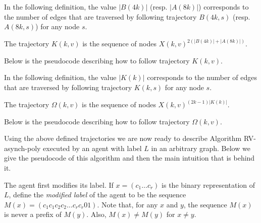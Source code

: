 \documentclass [11pt] {article}
\begin{document}
{In the following definition, the value $|B(4k)|$ (resp. $|A(8k)|$) corresponds to the number of edges that are traversed by following trajectory $B(4k,s)$ (resp. $A(8k,s)$) for any node $s$.}

\begin{definition}
\label{def:K}
The trajectory $K(k,v)$ is the sequence of nodes $X(k,v)^{2(|B(4k)|+|A(8k)|)}$. 
\end{definition}

{Below is the pseudocode describing how to follow trajectory $K(k,v)$.}

\begin{center}
\end{center} 

{In the following definition, the value $|K(k)|$ corresponds to the number of edges that are traversed by following trajectory $K(k,s)$ for any node $s$.}

\begin{definition}
\label{def:ome}
The trajectory $\Omega(k,v)$ is the sequence of nodes $X(k,v)^{(2k-1)|K(k)|}$.
\end{definition}

{Below is the pseudocode describing how to follow trajectory $\Omega(k,v)$.}

\begin{center}
\end{center} 


{Using the above defined trajectories we are now ready to describe Algorithm RV-asynch-poly executed by an agent with label $L$ in an arbitrary graph. Below we give the pseudocode of this algorithm and then the main intuition that is behind it.}



The agent first modifies its label. If $x=(c_1\dots c_r)$ is the binary representation of $L$, define the {\em modified label} of the agent to be the sequence $M(x)=(c_1c_1c_2c_2\dots c_rc_r01)$.  
Note that, for any $x$ and $y$, the sequence $M(x)$ is never a prefix of $M(y)$.
Also, $M(x) \neq M(y)$ for $x\neq y$. 
\end{document}
